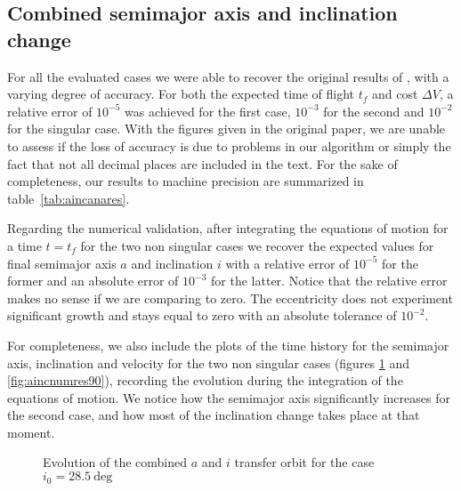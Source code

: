 \subsection{Combined semimajor axis and inclination change} \label{sec:resedelbaum}

For all the evaluated cases we were able to recover the original results of \cite{kechichian1997reformulation}, with a varying degree of accuracy. For both the expected time of flight $t_f$ and cost $\Delta V$, a relative error of $10^{-5}$ was achieved for the first case, $10^{-3}$ for the second and $10^{-2}$ for the singular case. With the figures given in the original paper, we are unable to assess if the loss of accuracy is due to problems in our algorithm or simply the fact that not all decimal places are included in the text. For the sake of completeness, our results to machine precision are summarized in table~\ref{tab:aincanares}.

Regarding the numerical validation, after integrating the equations of motion for a time $t = t_f$ for the two non singular cases we recover the expected values for final semimajor axis $a$ and inclination $i$ with a relative error of $10^{-5}$ for the former and an absolute error of $10^{-3}$ for the latter. Notice that the relative error makes no sense if we are comparing to zero. The eccentricity does not experiment significant growth and stays equal to zero with an absolute tolerance of $10^{-2}$.

For completeness, we also include the plots of the time history for the semimajor axis, inclination and velocity for the two non singular cases (figures \ref{fig:aincnumres28} and \ref{fig:aincnumres90}), recording the evolution during the integration of the equations of motion. We notice how the semimajor axis significantly increases for the second case, and how most of the inclination change takes place at that moment.

\begin{figure}%
\begin{subfigure}[b]{0.5\textwidth}
\centering
\resizebox{1.0\textwidth}{!}{

}
\end{subfigure}
\begin{subfigure}[b]{0.5\textwidth}
\centering
\resizebox{1.0\textwidth}{!}{

}
\end{subfigure}
\caption{Evolution of the combined $a$ and $i$ transfer orbit for the case $i_0 = 28.5~\text{deg}$}
\label{fig:aincnumres28}
\end{figure}


